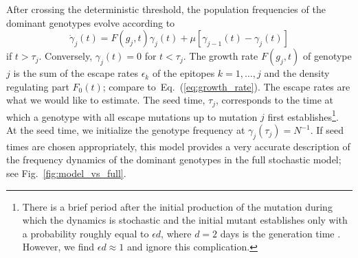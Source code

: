 \documentclass{frontiers}
\newcommand{\EQ}[1]{Eq.~(\ref{eq:#1})}
\newcommand{\FIG}[1]{Fig.~\ref{fig:#1}}
\newcommand{\gt}{g}
\newcommand{\gtfreq}{\gamma}
\newcommand{\fcoeff}{\epsilon}
\begin{document}
After crossing the deterministic threshold, the population frequencies 
of the dominant genotypes evolve according to
\begin{equation}
\label{eq:gt_dynamics}
\dot \gtfreq_j(t) = F(\gt_j,t)\gtfreq_j(t) +\mu [\gtfreq_{j-1}(t) - \gtfreq_{j}(t)]
\end{equation}
if $t>\tau_j$. Conversely, $\gtfreq_j(t)=0$ for $t<\tau_j$. The growth
rate $F(\gt_j,t)$ of genotype $j$ is the sum of the escape
rates $\fcoeff_k$ of the epitopes $k=1,\ldots,j$ and the density
regulating part $F_0(t)$; compare to~\EQ{growth_rate}. The escape rates are what we would like to
estimate.  The seed time, $\tau_j$, corresponds to the time
at which a genotype with all escape mutations up to mutation $j$ first
establishes\footnote{There is a brief period after the initial
  production of the mutation during which the dynamics is stochastic and
  the initial mutant establishes only with a probability roughly equal
  to $\epsilon d$, where $d=2$ days is the generation time
  \citep{markowitz_novel_2003}. However, we find $\epsilon d\approx 1$ and 
  ignore this complication.}.  At the seed time, we initialize the
genotype frequency at $\gtfreq_j(\tau_j)=N^{-1}$. If seed times are
chosen appropriately, this model provides a very accurate description of
the frequency dynamics of the dominant genotypes in the full stochastic
model; see \FIG{model_vs_full}.
\end{document}
